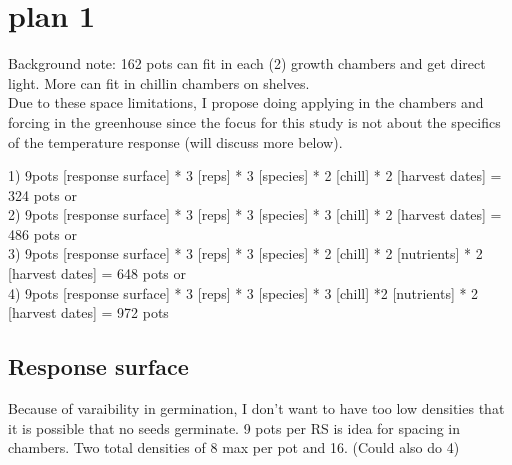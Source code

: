 \documentclass{article}\usepackage[]{graphicx}\usepackage[]{color}
\begin{document}
\section*{plan 1}
Background note: 162 pots can fit in each (2) growth chambers and get direct light. More can fit in chillin chambers on shelves.\\
Due to these space limitations, I propose doing applying in the chambers and forcing in the greenhouse since the focus for this study is not about the specifics of the temperature response (will discuss more below).

1) 9pots [response surface] * 3 [reps] * 3 [species] * 2 [chill]  * 2 [harvest dates] = 324 pots or \\

2) 9pots [response surface] * 3 [reps] * 3 [species] * 3 [chill]  * 2 [harvest dates] = 486 pots or\\ 

3) 9pots [response surface] * 3 [reps] * 3 [species] * 2 [chill] * 2 [nutrients] * 2 [harvest dates] = 648 pots or\\

4) 9pots [response surface] * 3 [reps] * 3 [species] * 3 [chill] *2 [nutrients] * 2 [harvest dates] = 972 pots \\
\subsection{Response surface}
Because of varaibility in germination, I don't want to have too low densities that it is possible that no seeds germinate. 9 pots per RS is idea for spacing in chambers. Two total densities of 8 max per pot and 16. (Could also do 4)
\end{document}
